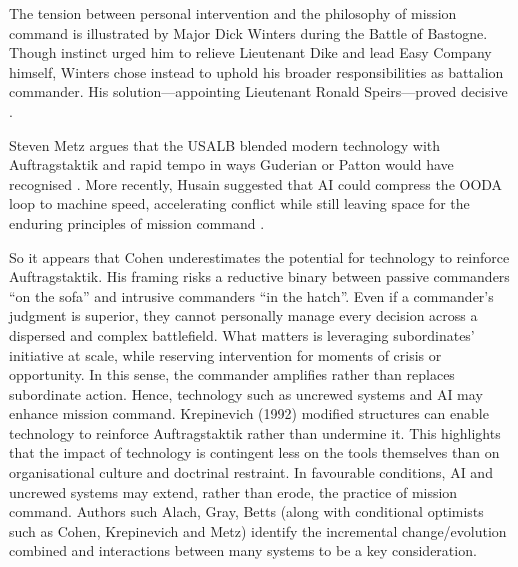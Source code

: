 The tension between personal intervention and the philosophy of mission command is illustrated by Major Dick Winters during the Battle of Bastogne. Though instinct urged him to relieve Lieutenant Dike and lead Easy Company himself, Winters chose instead to uphold his broader responsibilities as battalion commander. His solution---appointing Lieutenant Ronald Speirs---proved decisive \parencite[p.~186]{WINTERS_2006}.  

Steven Metz argues that the USALB blended modern technology with Auftragstaktik and rapid tempo in ways Guderian or Patton would have recognised \parencite{METZ_2000}. More recently, Husain suggested that AI could compress the OODA loop to machine speed, accelerating conflict while still leaving space for the enduring principles of mission command \parencite{HUSAIN_2021}.


So it appears that Cohen underestimates the potential for technology to reinforce Auftragstaktik. His framing risks a reductive binary between passive commanders ``on the sofa” and intrusive commanders ``in the hatch”. Even if a commander’s judgment is superior, they cannot personally manage every decision across a dispersed and complex battlefield. What matters is leveraging subordinates’ initiative at scale, while reserving intervention for moments of crisis or opportunity. In this sense, the commander amplifies rather than replaces subordinate action. Hence, technology such as uncrewed systems and AI may enhance mission command. Krepinevich (1992) modified structures can enable technology to reinforce Auftragstaktik rather than undermine it\nocite{KREPINEVICH_1992}. This highlights that the impact of technology is contingent less on the tools themselves than on organisational culture and doctrinal restraint. In favourable conditions, AI and uncrewed systems may extend, rather than erode, the practice of mission command. %
 Authors such Alach, Gray, Betts (along with conditional optimists such as Cohen, Krepinevich and Metz) identify the incremental change/evolution combined and interactions between many systems to be a key consideration.



